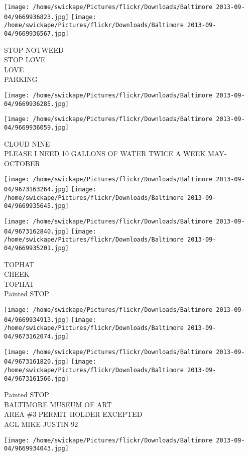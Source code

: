 \documentclass[10pt,letterpaper]{article}
\begin{document}
\texttt{[image: /home/swickape/Pictures/flickr/Downloads/Baltimore 2013-09-04/9669936823.jpg]}
\texttt{[image: /home/swickape/Pictures/flickr/Downloads/Baltimore 2013-09-04/9669936567.jpg]}

STOP NOTWEED\\
STOP LOVE\\
LOVE\\
PARKING
\pagebreak

\texttt{[image: /home/swickape/Pictures/flickr/Downloads/Baltimore 2013-09-04/9669936285.jpg]}

\vspace{0.25in}
\texttt{[image: /home/swickape/Pictures/flickr/Downloads/Baltimore 2013-09-04/9669936059.jpg]}

CLOUD NINE\\
PLEASE I NEED 10 GALLONS OF WATER TWICE A WEEK MAY{-}OCTOBER
\pagebreak

\texttt{[image: /home/swickape/Pictures/flickr/Downloads/Baltimore 2013-09-04/9673163264.jpg]}
\texttt{[image: /home/swickape/Pictures/flickr/Downloads/Baltimore 2013-09-04/9669935645.jpg]}

\texttt{[image: /home/swickape/Pictures/flickr/Downloads/Baltimore 2013-09-04/9673162840.jpg]}
\texttt{[image: /home/swickape/Pictures/flickr/Downloads/Baltimore 2013-09-04/9669935201.jpg]}

TOPHAT\\
CHEEK\\
TOPHAT\\
Painted STOP
\pagebreak

\texttt{[image: /home/swickape/Pictures/flickr/Downloads/Baltimore 2013-09-04/9669934913.jpg]}
\texttt{[image: /home/swickape/Pictures/flickr/Downloads/Baltimore 2013-09-04/9673162074.jpg]}

\texttt{[image: /home/swickape/Pictures/flickr/Downloads/Baltimore 2013-09-04/9673161820.jpg]}
\texttt{[image: /home/swickape/Pictures/flickr/Downloads/Baltimore 2013-09-04/9673161566.jpg]}

Painted STOP\\
BALTIMORE MUSEUM OF ART\\
AREA \#3 PERMIT HOLDER EXCEPTED\\
AGL MIKE JUSTIN 92
\pagebreak

\texttt{[image: /home/swickape/Pictures/flickr/Downloads/Baltimore 2013-09-04/9669934043.jpg]}
\end{document}
